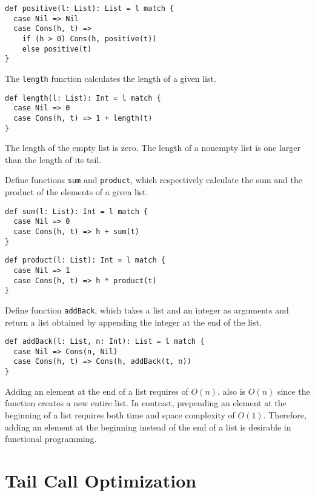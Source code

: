 \begin{verbatim}
def positive(l: List): List = l match {
  case Nil => Nil
  case Cons(h, t) =>
    if (h > 0) Cons(h, positive(t))
    else positive(t)
}
\end{verbatim}

The \verb!length! function calculates the length of a given list.

\begin{verbatim}
def length(l: List): Int = l match {
  case Nil => 0
  case Cons(h, t) => 1 + length(t)
}
\end{verbatim}

The length of the empty list is zero. The length of a nonempty list is one larger
than the length of its tail.

Define functions \verb!sum! and \verb!product!, which respectively calculate the
sum and the product of the elements of a given list.

\begin{verbatim}
def sum(l: List): Int = l match {
  case Nil => 0
  case Cons(h, t) => h + sum(t)
}
\end{verbatim}

\begin{verbatim}
def product(l: List): Int = l match {
  case Nil => 1
  case Cons(h, t) => h * product(t)
}
\end{verbatim}

Define function \verb!addBack!, which takes a list and an integer as arguments
and return a list obtained by appending the integer at the end of the list.

\begin{verbatim}
def addBack(l: List, n: Int): List = l match {
  case Nil => Cons(n, Nil)
  case Cons(h, t) => Cons(h, addBack(t, n))
}
\end{verbatim}

Adding an element at the end of a list requires  of
\(O(n)\).  also is \(O(n)\) since the function creates a
new entire list. In contrast, prepending an element at the beginning of a list
requires both time and space complexity of \(O(1)\). Therefore, adding an element
at the beginning instead of the end of a list is desirable in functional
programming.

\section{Tail Call Optimization}

